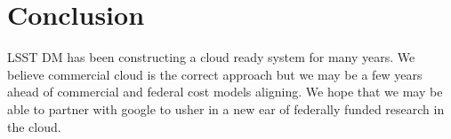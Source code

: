 
\section{Conclusion}

LSST \gls{DM} has been constructing a cloud ready system for many years. We believe commercial cloud is the correct approach but we may be a few years ahead of commercial and federal cost models aligning. We hope that we may be able to partner with google to usher in a new ear of federally funded research in the cloud.

~

